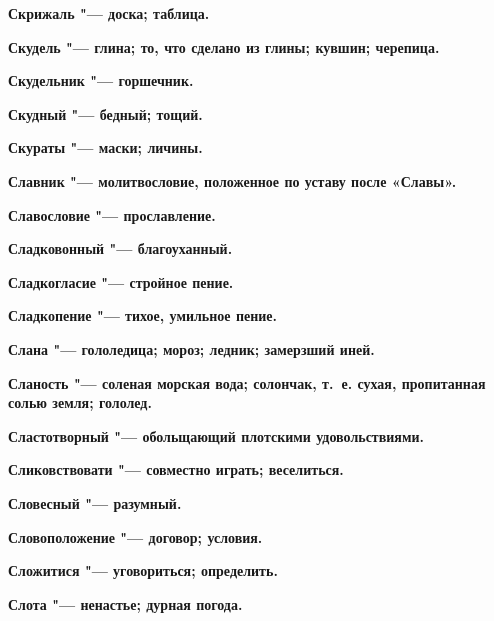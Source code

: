 \begin{multicols}{2}
\bfseries Скрижаль\normalfont{} "--- доска; таблица. 




\bfseries Скудель\normalfont{} "--- глина; то, что сделано из глины; кувшин; черепица. 




\bfseries Скудельник\normalfont{} "--- горшечник. 




\bfseries Скудный\normalfont{} "--- бедный; тощий. 




\bfseries Скураты\normalfont{} "--- маски; личины. 




\bfseries Славник\normalfont{} "--- молитвословие, положенное по уставу после «Славы». 




\bfseries Славословие\normalfont{} "--- прославление. 




\bfseries Сладковонный\normalfont{} "--- благоуханный. 




\bfseries Сладкогласие\normalfont{} "--- стройное пение. 




\bfseries Сладкопение\normalfont{} "--- тихое, умильное пение. 




\bfseries Слана\normalfont{} "--- гололедица; мороз; ледник; замерзший иней. 




\bfseries Сланость\normalfont{} "--- соленая морская вода; солончак, т.~е. сухая, пропитанная солью земля; гололед. 




\bfseries Сластотворный\normalfont{} "--- обольщающий плотскими удовольствиями. 




\bfseries Сликовствовати\normalfont{} "--- совместно играть; веселиться. 




\bfseries Словесный\normalfont{} "--- разумный. 




\bfseries Словоположение\normalfont{} "--- договор; условия. 




\bfseries Сложитися\normalfont{} "--- уговориться; определить. 




\bfseries Слота\normalfont{} "--- ненастье; дурная погода. 





\end{multicols}
